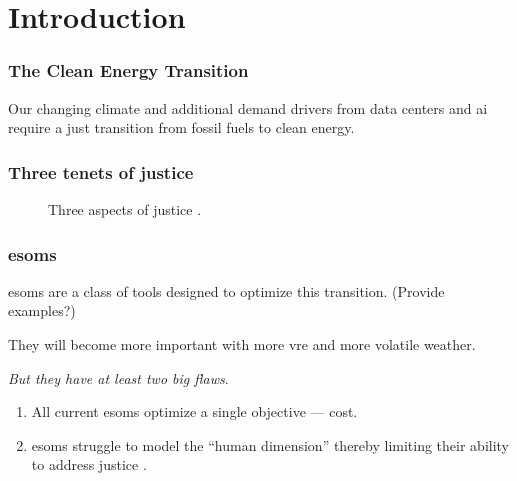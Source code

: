 \section{Introduction}

\begin{frame}
    \frametitle{The Clean Energy Transition}
    Our changing climate and additional demand drivers from data 
    centers and \gls{ai} require a just transition from fossil 
    fuels to clean energy.
\end{frame}

\begin{frame}
    \frametitle{Three tenets of justice}
    \begin{figure}
        \centering

        \caption{Three aspects of justice \cite{schlosberg_1_2007}.}
    \end{figure}
\end{frame}

\begin{frame}
    \frametitle{\glspl{esom}}
    \Glspl{esom} are a class of tools designed to 
    optimize this transition. (Provide examples?)

    They will become more important with more \gls{vre}
    and more volatile weather.

    \textit{But they have at least two big flaws}.
    \begin{enumerate}
        \item All current \glspl{esom} optimize a single objective --- cost.
        \item \glspl{esom} struggle to model the ``human dimension'' thereby
        limiting their ability to address justice \cite{pfenninger_energy_2014}.

    \end{enumerate}
\end{frame}

